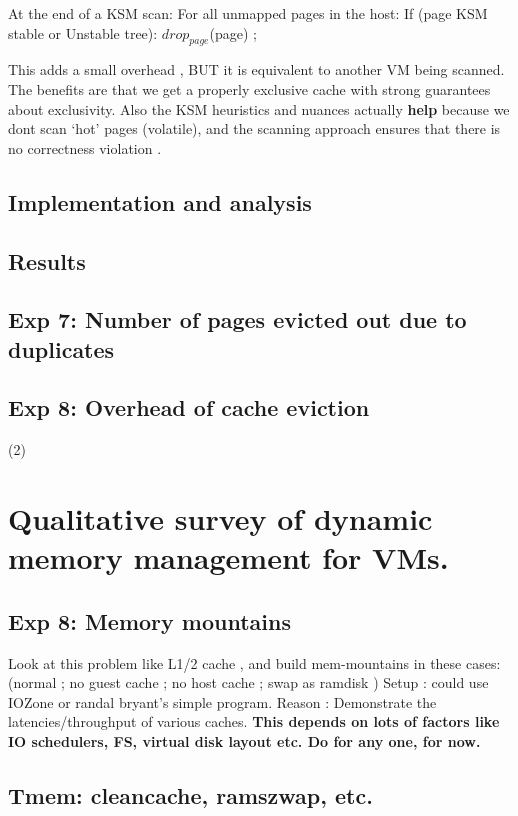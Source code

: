 \documentclass[10pt,a4paper]{article}
\begin{document}
At the end of a  KSM scan: 
   For all unmapped pages in the host: 
       If (page \in KSM stable or Unstable tree): 
          $drop_{page}$(page) ; 
 

This adds a small overhead , BUT it is equivalent to another VM being scanned. 
The benefits are that we get a properly exclusive cache with strong guarantees 
about exclusivity. Also the KSM heuristics and nuances actually \textbf{help} because 
we dont scan `hot' pages (volatile), and the scanning approach ensures that 
there is no correctness violation .

\subsection{Implementation and analysis}

\subsection{Results}


\subsection{Exp 7: Number of pages evicted out due to duplicates}

\subsection{Exp 8: Overhead of cache eviction}

   (2)
\section{Qualitative survey of dynamic memory management for VMs.}

\subsection{Exp 8: Memory mountains}

Look at this problem like L1/2 cache , and build mem-mountains in these cases:
(normal ; no guest cache ; no host cache ; swap as ramdisk )
Setup : could use IOZone or randal bryant's simple program.
Reason : Demonstrate the latencies/throughput of various caches. 
\textbf{This depends on lots of factors like IO schedulers, FS, virtual disk layout etc. Do for any one, for now.}

\subsection{Tmem: cleancache, ramszwap, etc.}
\end{document}
